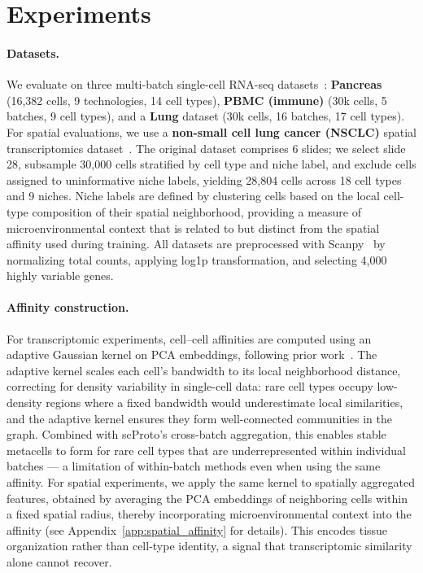 \section{Experiments}

\paragraph{Datasets.}
We evaluate on three multi-batch single-cell RNA-seq datasets~\citep{luecken2020benchmarking}:
\textbf{Pancreas} (16,382 cells, 9 technologies, 14 cell types),
\textbf{PBMC (immune)} (30k cells, 5 batches, 9 cell types),
and a \textbf{Lung} dataset (30k cells, 16 batches, 17 cell types).
For spatial evaluations, we use a \textbf{non-small cell lung cancer (NSCLC)} spatial transcriptomics dataset~\citep{pentimalli2025combining}.
The original dataset comprises 6 slides; we select slide 28, subsample 30,000 cells stratified by cell type and niche label, and exclude cells assigned to uninformative niche labels, yielding 28,804 cells across 18 cell types and 9 niches.
Niche labels are defined by clustering cells based on the local cell-type composition of their spatial neighborhood, providing a measure of microenvironmental context that is related to but distinct from the spatial affinity used during training.
All datasets are preprocessed with Scanpy~\citep{wolf2018scanpy} by normalizing total counts, applying log1p transformation, and selecting 4,000 highly variable genes.

\paragraph{Affinity construction.}
For transcriptomic experiments, cell--cell affinities are computed using an adaptive Gaussian kernel on PCA embeddings, following prior work~\citep{seacells}.
The adaptive kernel scales each cell's bandwidth to its local neighborhood distance, correcting for density variability in single-cell data: rare cell types occupy low-density regions where a fixed bandwidth would underestimate local similarities, and the adaptive kernel ensures they form well-connected communities in the graph.
Combined with scProto's cross-batch aggregation, this enables stable metacells to form for rare cell types that are underrepresented within individual batches --- a limitation of within-batch methods even when using the same affinity.
For spatial experiments, we apply the same kernel to spatially aggregated features, obtained by averaging the PCA embeddings of neighboring cells within a fixed spatial radius, thereby incorporating microenvironmental context into the affinity (see Appendix~\ref{app:spatial_affinity} for details).
This encodes tissue organization rather than cell-type identity, a signal that transcriptomic similarity alone cannot recover.

